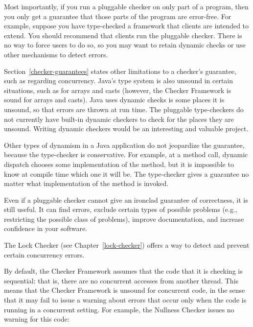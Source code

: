 Most importantly, if you run a pluggable checker on only part of a program, then
you only get a guarantee that those parts of the program are error-free.
For example, suppose you have type-checked a framework that clients
are intended to extend.  You should recommend that clients
run the pluggable checker.  There is no way to force users to do so, so you
may want to retain dynamic checks or use other mechanisms to detect errors.

Section~\ref{checker-guarantees} states other limitations to a checker's
guarantee, such as regarding concurrency.  Java's type system is also
unsound in certain situations, such as for arrays and casts (however, the
Checker Framework is sound for arrays and casts).  Java uses dynamic checks
is some places it is unsound, so that errors are thrown at run time.  The
pluggable type-checkers do not currently have built-in dynamic checkers to
check for the places they are unsound.
Writing dynamic checkers would be an interesting and valuable project.

Other types of dynamism in a Java application do not jeopardize the
guarantee, because the type-checker is conservative.  For example, at a
method call, dynamic dispatch chooses some implementation of the method,
but it is impossible to know at compile time which one it will be.  The
type-checker gives a guarantee no matter what implementation of the method
is invoked.


Even if a pluggable checker cannot give an ironclad
guarantee of correctness, it is still useful.  It can find errors,
exclude certain types of possible problems (e.g., restricting the
possible class of problems), improve documentation, and increase confidence
in your software.



The Lock Checker (see Chapter~\ref{lock-checker}) offers a way to detect
and prevent certain concurrency errors.


By default, the Checker Framework assumes that the code that it is checking
is sequential:  that is, there are no concurrent accesses from another
thread.  This means that the Checker Framework is unsound for concurrent
code, in the sense that it may fail to issue a warning about errors that
occur only when the code is running in a concurrent setting.
For example, the Nullness Checker issues no warning for this
code:


